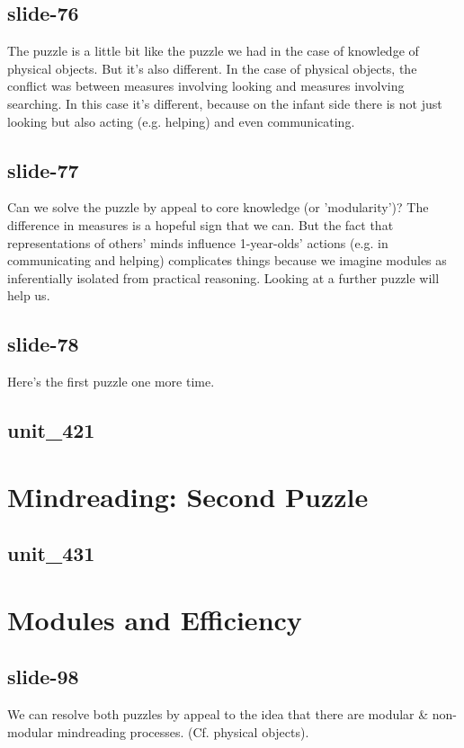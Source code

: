 \documentclass[12pt,\papersize]{extarticle}
\begin{document}
 
\subsection{slide-76}
The puzzle is a little bit like the puzzle we had in the case of knowledge of physical objects.
But it's also different.
In the case of physical objects, the conflict was between measures involving looking and measures involving searching.
In this case it's different, because on the infant side there is not just looking but also acting (e.g. helping) and even communicating.
 
 
\subsection{slide-77}
Can we solve the puzzle by appeal to core knowledge (or 'modularity')?
The difference in measures is a hopeful sign that we can.
But the fact that representations of others' minds influence 1-year-olds' actions (e.g. in communicating and helping) complicates things because we imagine modules as inferentially isolated from practical reasoning.
Looking at a further puzzle will help us.
 
 
\subsection{slide-78}
Here's the first puzzle one more time.
 
 
\subsection{unit\_421}
 
\section{Mindreading: Second Puzzle}
 
 
\subsection{unit\_431}
 
\section{Modules and Efficiency}
 
 
\subsection{slide-98}
We can resolve both puzzles by appeal to the idea that there are modular \& non-modular mindreading processes. (Cf. physical objects).
 
\end{document}
